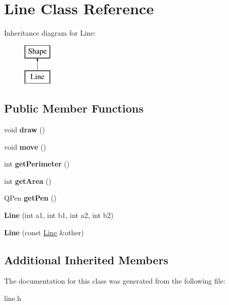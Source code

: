\hypertarget{class_line}{}\section{Line Class Reference}
\label{class_line}
Inheritance diagram for Line\+:\begin{figure}[H]
\begin{center}
\leavevmode
\includegraphics[height=2.000000cm]{class_line}
\end{center}
\end{figure}
\subsection*{Public Member Functions}
\begin{DoxyCompactItemize}
\item 
\mbox{\label{class_line_ab6265993bf5acbc28830181c3e712f10}} 
void {\bfseries draw} ()
\item 
\mbox{\label{class_line_a2795de3dd5a6eb05a1b8aaec57aa1f9f}} 
void {\bfseries move} ()
\item 
\mbox{\label{class_line_a34ff8a27e7c17a4d4cbc50ddd8769312}} 
int {\bfseries get\+Perimeter} ()
\item 
\mbox{\label{class_line_ab66fd39f66f4caa5284f0e9c2d3a36fa}} 
int {\bfseries get\+Area} ()
\item 
\mbox{\label{class_line_a5f45efd96d106724b175d8d52549b446}} 
Q\+Pen {\bfseries get\+Pen} ()
\item 
\mbox{\label{class_line_a8ca597644c62d0b8ab63bfaaab1dc494}} 
{\bfseries Line} (int a1, int b1, int a2, int b2)
\item 
\mbox{\label{class_line_ac40968264c0af3b70506c13ce3b70b5b}} 
{\bfseries Line} (const \mbox{\hyperlink{class_line}{Line}} \&other)
\end{DoxyCompactItemize}
\subsection*{Additional Inherited Members}


The documentation for this class was generated from the following file\+:\begin{DoxyCompactItemize}
\item 
line.\+h\end{DoxyCompactItemize}
